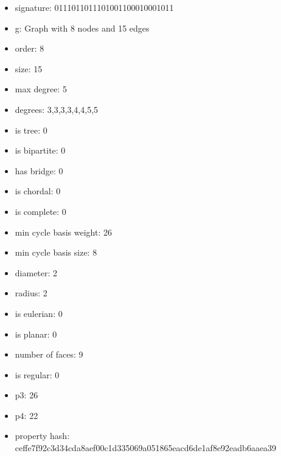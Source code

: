 \begin{itemize}
\item signature: 0111011011101001100010001011
\item g: Graph with 8 nodes and 15 edges
\item order: 8
\item size: 15
\item max degree: 5
\item degrees: 3,3,3,3,4,4,5,5
\item is tree: 0
\item is bipartite: 0
\item has bridge: 0
\item is chordal: 0
\item is complete: 0
\item min cycle basis weight: 26
\item min cycle basis size: 8
\item diameter: 2
\item radius: 2
\item is eulerian: 0
\item is planar: 0
\item number of faces: 9
\item is regular: 0
\item p3: 26
\item p4: 22
\item property hash: ceffe7f92c3d34cda8aef00c1d335069a051865eacd6de1af8e92eadb6aaea39
\end{itemize}
\newpage
\begin{figure}
\end{figure}

